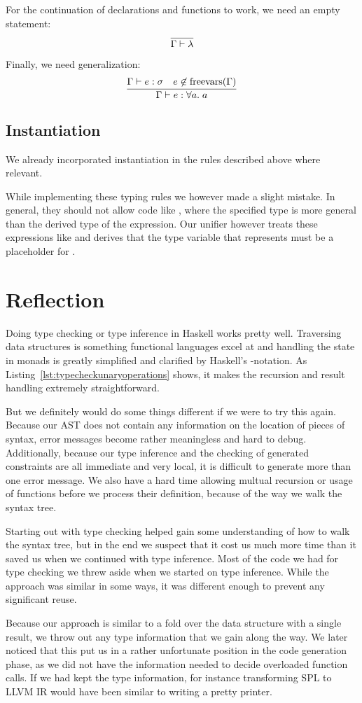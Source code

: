 For the continuation of declarations and functions to work, we need an empty statement:
\[
    \infer{\Gamma \vdash \lambda}{}
\]

Finally, we need generalization:
\[
    \infer{\Gamma \vdash e : \forall a.\; a}{
        \Gamma \vdash e : \sigma &
        e \not\in \operatorname{freevars}(\Gamma)
    }
\]


\subsection{Instantiation}

We already incorporated instantiation in the rules described above where relevant.

While implementing these typing rules we however made a slight mistake.
In general, they should not allow code like , where the specified type is more general than the derived type of the expression.
Our unifier however treats these expressions like  and derives that the type variable that  represents must be a placeholder for .

\section{Reflection}

Doing type checking or type inference in Haskell works pretty well.
Traversing data structures is something functional languages excel at and handling the state in monads is greatly simplified and clarified by Haskell's -notation.
As Listing~\ref{lst:typecheckunaryoperations} shows, it makes the recursion and result handling extremely straightforward.

But we definitely would do some things different if we were to try this again.
Because our AST does not contain any information on the location of pieces of syntax, error messages become rather meaningless and hard to debug.
Additionally, because our type inference and the checking of generated constraints are all immediate and very local, it is difficult to generate more than one error message.
We also have a hard time allowing multual recursion or usage of functions before we process their definition, because of the way we walk the syntax tree.

Starting out with type checking helped gain some understanding of how to walk the syntax tree, but in the end we suspect that it cost us much more time than it saved us when we continued with type inference.
Most of the code we had for type checking we threw aside when we started on type inference.
While the approach was similar in some ways, it was different enough to prevent any significant reuse.

Because our approach is similar to a fold over the data structure with a single result, we throw out any type information that we gain along the way.
We later noticed that this put us in a rather unfortunate position in the code generation phase, as we did not have the information needed to decide overloaded function calls.
If we had kept the type information, for instance transforming SPL to LLVM IR would have been similar to writing a pretty printer.



